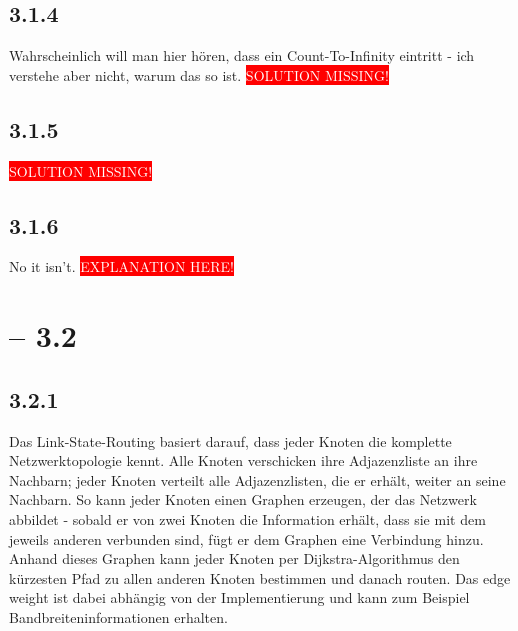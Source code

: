 \documentclass[a4paper,
			llpt,
			solution,
			accentcolor=tud2d,
			colorbacktitle
			]
			{tudexercise}
\newcommand{\8}{$\infty$}
\begin{document}
\subsection{3.1.4}
Wahrscheinlich will man hier hören, dass ein Count-To-Infinity eintritt - ich verstehe aber nicht, warum das so ist.
\colorbox{red}{\textcolor{white}{SOLUTION MISSING!}}
\subsection{3.1.5}
\colorbox{red}{\textcolor{white}{SOLUTION MISSING!}}
\subsection{3.1.6}
No it isn't. \colorbox{red}{\textcolor{white}{EXPLANATION HERE!}}
\section{ -- 3.2}
\subsection{3.2.1}
Das Link-State-Routing basiert darauf, dass jeder Knoten die komplette Netzwerktopologie kennt. Alle Knoten verschicken ihre Adjazenzliste an ihre Nachbarn; jeder Knoten verteilt alle Adjazenzlisten, die er erhält, weiter an seine Nachbarn. So kann jeder Knoten einen Graphen erzeugen, der das Netzwerk abbildet - sobald er von zwei Knoten die Information erhält, dass sie mit dem jeweils anderen verbunden sind, fügt er dem Graphen eine Verbindung hinzu. Anhand dieses Graphen kann jeder Knoten per Dijkstra-Algorithmus den kürzesten Pfad zu allen anderen Knoten bestimmen und danach routen. Das edge weight ist dabei abhängig von der Implementierung und kann zum Beispiel Bandbreiteninformationen erhalten. 
\end{document}
